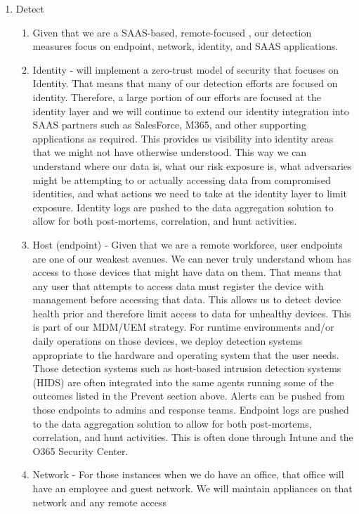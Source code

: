 \documentclass[../main.tex]{subfiles}
\begin{document}
\begin{enumerate}
    \item Detect
    \begin{enumerate}
        \item Given that we are a SAAS-based, remote-focused \CompanyName{}, our detection measures focus on endpoint, network, identity, and SAAS applications.
        \item Identity - \CompanyName{} will implement a zero-trust model of security that focuses on Identity. That means that many of our detection efforts are focused on identity.
        Therefore, a large portion of our efforts are focused at the identity layer and we will continue to extend our identity integration into SAAS partners such as SalesForce, M365,
        and other supporting applications as required. This provides us visibility into identity areas that we might not have otherwise understood. This way we can understand where our data is,
        what our risk exposure is, what adversaries might be attempting to or actually accessing data from compromised identities, and what actions we need to take at the identity layer to limit
        exposure. Identity logs are pushed to the data aggregation solution to allow for both post-mortems, correlation, and hunt activities.
        \item Host (endpoint) - Given that we are a remote workforce, user endpoints are one of our weakest avenues.  We can never truly understand whom has access to those devices that might
        have \CompanyName{} data on them. That means that any user that attempts to access \CompanyName{} data must register the device with \CompanyName{} management before accessing that data. This allows us to
        detect device health prior and therefore limit access to data for unhealthy devices. This is part of our MDM/UEM strategy. For runtime environments and/or daily operations on those devices,
        we deploy detection systems appropriate to the hardware and operating system that the user needs. Those detection systems such as host-based intrusion detection systems (HIDS) are often
        integrated into the same agents running some of the outcomes listed in the Prevent section above. Alerts can be pushed from those endpoints to admins and response teams. Endpoint logs are
        pushed to the data aggregation solution to allow for both post-mortems, correlation, and hunt activities. This is often done through Intune and the O365 Security Center.
        \item Network - For those instances when we do have an office, that office will have an employee and guest network. We will maintain appliances on that network and any remote access

\end{enumerate}
\end{enumerate}
\end{document}

